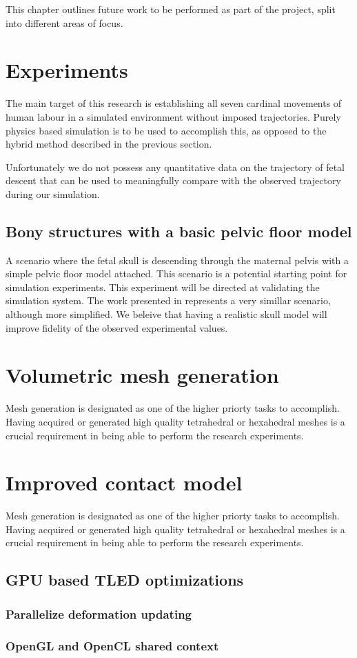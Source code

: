 This chapter outlines future work to be performed as part of the project, split into different areas of focus.

\section{Experiments}

The main target of this research is establishing all seven cardinal movements of human labour in a simulated environment without imposed trajectories. Purely physics based simulation is to be used to accomplish this, as opposed to the hybrid method described in the previous section.

Unfortunately we do not possess any quantitative data on the trajectory of fetal descent that can be used to meaningfully compare with the observed trajectory during our simulation.

\subsection{Bony structures with a basic pelvic floor model}
A scenario where the fetal skull is descending through the maternal pelvis with a simple pelvic floor model attached. This scenario is a potential starting point for simulation experiments. This experiment will be directed at validating the simulation system. The work presented in \cite{parente2014} represents a very simillar scenario, although more simplified. We beleive that having a realistic skull model will improve fidelity of the observed experimental values.

\section{Volumetric mesh generation}\label{future-meshgen}

Mesh generation is designated as one of the higher priorty tasks to accomplish. Having acquired or generated high quality tetrahedral or hexahedral meshes is a crucial requirement in being able to perform the research experiments.

\section{Improved contact model}\label{future-meshgen}

Mesh generation is designated as one of the higher priorty tasks to accomplish. Having acquired or generated high quality tetrahedral or hexahedral meshes is a crucial requirement in being able to perform the research experiments.

\subsection{GPU based TLED optimizations}

\subsubsection{Parallelize deformation updating}

\subsubsection{OpenGL and OpenCL shared context}
